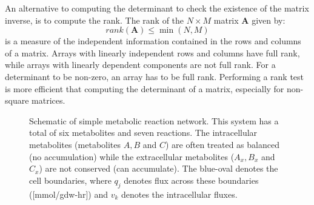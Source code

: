 \documentclass[11pt]{article}
\theoremstyle{definition}
\begin{document}
An alternative to computing the determinant to check the existence of the matrix inverse, is to compute the rank. The rank of the $N\times{M}$ matrix $\mathbf{A}$ given by:
\begin{equation}
	rank\left(\mathbf{A}\right)\leq\min\left(N,M\right)
\end{equation}is a measure of the independent information contained in the rows and columns of a matrix. Arrays with linearly independent rows and columns have full rank, while arrays with linearly dependent components are not full rank. For a determinant to be non-zero, an array has to be full rank. Performing a rank test is more efficient that computing the determinant of a matrix, especially for non-square matrices.

\begin{figure*}[h!]\centering
{}
\caption{Schematic of simple metabolic reaction network. This system has a total of six metabolites and seven reactions. The intracellular metabolites (metabolites $A,B$ and $C$) are often treated as balanced (no accumulation) while the extracellular metabolites ($A_{x},B_{x}$ and $C_{x}$) are not conserved (can accumulate). The blue-oval denotes the cell boundaries, where $q_{j}$ denotes flux across these boundaries ([mmol/gdw-hr]) and $v_{k}$ denotes the intracellular fluxes.}\label{fig-system}
\end{figure*}
\end{document}
